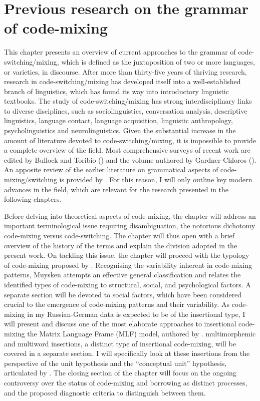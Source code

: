 \chapter{Previous research on the grammar of code-mixing}\label{CM}
This chapter presents an overview of current approaches to the grammar of code-switching/mixing, which is defined as the juxtaposition of two or more languages, or varieties, in discourse. After more than thirty-five years of thriving research, research in code-switching/mixing has developed itself into a well-established branch of linguistics, which has found its way into introductory linguistic textbooks. The study of code-switching/mixing has strong interdisciplinary links to diverse disciplines, such as sociolinguistics, conversation analysis, descriptive linguistics, language contact, language acquisition, linguistic anthropology, psycholinguistics and neurolinguistics. Given the substantial increase in the amount of literature devoted to code-switching/mixing, it is impossible to provide a complete overview of the field. Most comprehensive surveys of recent work are  edited by Bullock and Toribio (\citeyear{bullock-toribio}) and the volume  authored by Gardner-Chloros (\citeyear{gardner-chloros_code-switching_2009}). An apposite review of the earlier literature on grammatical aspects of code-mixing/switching is provided by  \citet[Chapter 1]{boumans-syntax-1998}. For this reason, I will only outline key modern advances in the field, which are relevant for the research presented in the following chapters. 

Before delving into theoretical aspects of code-mixing, the chapter will address an important terminological issue requiring disambiguation, the notorious dichotomy code-mixing versus code-switching. The chapter will thus open with a brief overview of the history of the terms and explain the division adopted in the present work. On tackling this issue, the chapter will proceed with the typology of code-mixing proposed by \citet[][]{muysken-bilingual-2000}. Recognising the variability inherent in code-mixing patterns, Muysken attempts an effective general classification and relates the identified types of code-mixing to structural, social, and psychological factors. A separate section will be devoted to social factors, which have been considered crucial to the emergence of  code-mixing patterns and their variability. As code-mixing in my Russian-German data is expected to be of the insertional type, I will present and discuss one of the most elaborate approaches to insertional code-mixing the Matrix Language Frame (MLF) model, authored by \citet[][]{myers-scotton-duelling-1993,myers-scotton-contact-2002}. multimorphemic and multiword insertions, a distinct type of insertional code-mixing, will be covered in a separate section. I will specifically look at these insertions from the perspective of the unit hypothesis and the ``conceptual unit'' hypothesis, articulated by \citet[][]{backus-evidence-1999,backus-units-2003}. The closing section of the chapter will focus on the ongoing controversy over the status of code-mixing and borrowing as distinct processes, and the proposed diagnostic criteria to distinguish between them. 

